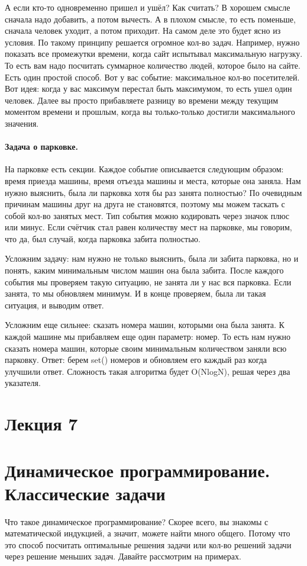 \documentclass[12pt]{article}
\begin{document}
А если кто-то одновременно пришел и ушёл? Как считать? В хорошем смысле сначала надо добавить, а потом вычесть. А в плохом смысле, то есть поменьше, сначала человек уходит, а потом приходит. На самом деле это будет ясно из условия. По такому принципу решается огромное кол-во задач. Например, нужно показать все промежутки времени, когда сайт испытывал максимальную нагрузку. То есть вам надо посчитать суммарное количество людей, которое было на сайте. Есть один простой способ. Вот у вас событие: максимальное кол-во посетителей. Вот идея: когда у вас максимум перестал быть максимумом, то есть ушел один человек. Далее вы просто прибавляете разницу во времени между текущим моментом времени и прошлым, когда вы только-только достигли максимального значения.
\paragraph{Задача о парковке.}
На парковке есть секции. Каждое событие описывается следующим образом: время приезда машины, время отъезда машины и места, которые она заняла. Нам нужно выяснить, была ли парковка хотя бы раз занята полностью? По очевидным причинам машины друг на друга не становятся, поэтому мы можем таскать с собой кол-во занятых мест. Тип события можно кодировать через значок плюс или минус. Если счётчик стал равен количеству мест на парковке, мы говорим, что да, был случай, когда парковка забита полностью.

Усложним задачу: нам нужно не только выяснить, была ли забита парковка, но и понять, каким минимальным числом машин она была забита. После каждого события мы проверяем такую ситуацию, не занята ли у нас вся парковка. Если занята, то мы обновляем минимум. И в конце проверяем, была ли такая ситуация, и выводим ответ.

Усложним еще сильнее: сказать номера машин, которыми она была занята. К каждой машине мы прибавляем еще один параметр: номер. То есть нам нужно сказать номера машин, которые своим минимальным количеством заняли всю парковку. Ответ: берем set() номеров и обновляем его каждый раз когда улучшили ответ. Сложность такая алгоритма будет O(NlogN), решая через два указателя.

\newpage
\section*{Лекция 7}
\section*{Динамическое программирование. Классические задачи}
Что такое динамическое программирование? Скорее всего, вы знакомы с математической индукцией, а значит, можете найти много общего. Потому что это способ посчитать оптимальные решения задачи или кол-во решений задачи через решение меньших задач. Давайте рассмотрим на примерах.
\end{document}
